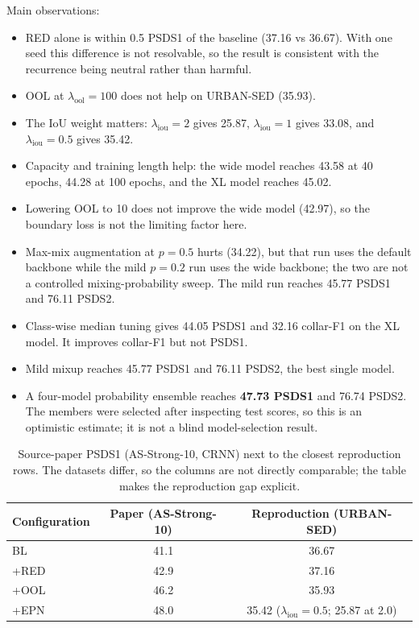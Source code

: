 Main observations:
\begin{itemize}
\item RED alone is within 0.5 PSDS1 of the baseline (37.16 vs 36.67). With one
      seed this difference is not resolvable, so the result is consistent with
      the recurrence being neutral rather than harmful.
\item OOL at $\lambda_{\mathrm{ool}}=100$ does not help on URBAN-SED (35.93).
\item The IoU weight matters: $\lambda_{\mathrm{iou}}=2$ gives 25.87,
      $\lambda_{\mathrm{iou}}=1$ gives 33.08, and $\lambda_{\mathrm{iou}}=0.5$
      gives 35.42.
\item Capacity and training length help: the wide model reaches 43.58 at 40
      epochs, 44.28 at 100 epochs, and the XL model reaches 45.02.
\item Lowering OOL to 10 does not improve the wide model (42.97), so the
      boundary loss is not the limiting factor here.
\item Max-mix augmentation at $p=0.5$ hurts (34.22), but that run uses the
      default backbone while the mild $p=0.2$ run uses the wide backbone; the
      two are not a controlled mixing-probability sweep. The mild run reaches
      45.77 PSDS1 and 76.11 PSDS2.
\item Class-wise median tuning gives 44.05 PSDS1 and 32.16 collar-F1 on the XL
      model. It improves collar-F1 but not PSDS1.
\item Mild mixup reaches 45.77 PSDS1 and 76.11 PSDS2, the best single model.
\item A four-model probability ensemble reaches \textbf{47.73 PSDS1} and
      76.74 PSDS2. The members were selected after inspecting test scores, so
      this is an optimistic estimate; it is not a blind model-selection result.
\end{itemize}

\begin{table}[!ht]
\centering
\caption{Source-paper PSDS1 (AS-Strong-10, CRNN) next to the closest
reproduction rows. The datasets differ, so the columns are not directly
comparable; the table makes the reproduction gap explicit.}
\label{tab:source}
\begin{tabular}{lcc}
\toprule
Configuration & Paper (AS-Strong-10) & Reproduction (URBAN-SED) \\
\midrule
BL & 41.1 & 36.67 \\
+RED & 42.9 & 37.16 \\
+OOL & 46.2 & 35.93 \\
+EPN & 48.0 & 35.42 ($\lambda_{\mathrm{iou}}=0.5$; 25.87 at 2.0) \\
\bottomrule
\end{tabular}
\end{table}

